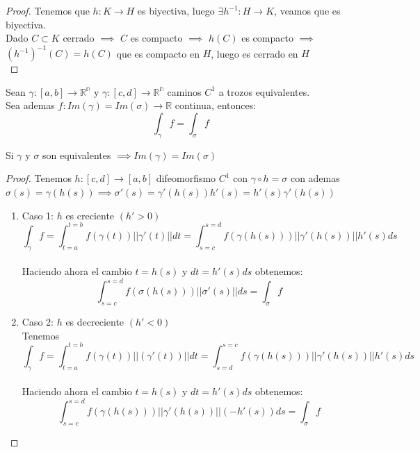 \begin{proof}
    Tenemos que $h:K \to H$ es biyectiva, luego $\exists h^{-1}:H \to K$, veamos que es biyectiva. \\
    Dado $C \subset K$ cerrado $\implies$ $C$ es compacto $\implies$ $h(C)$ es compacto $\implies$ $(h^{-1})^{-1}(C)=h(C)$ que es compacto en $H$, luego es cerrado en $H$ \\
\end{proof}

\begin{teorema}
    Sean $\gamma: [a,b] \to \mathbb{R^n}$ y $\gamma:[c,d] \to \mathbb{R^n}$ caminos $C^1$ a trozos equivalentes. \\
    Sea ademas $f:Im(\gamma)=Im(\sigma) \to \mathbb{R}$ continua, entonces: \\
    $$\int_{\gamma}f=\int_{\sigma}f$$
\end{teorema}

\begin{observación}
    Si $\gamma$ y $\sigma$ son equivalentes $\implies Im(\gamma)=Im(\sigma)$
\end{observación}

\begin{proof}
    Tenemos $h:[c,d] \to [a,b]$ difeomorfismo $C^1$ con $\gamma \circ h = \sigma$ con ademas $\sigma(s) = \gamma(h(s)) \implies \sigma'(s) = \gamma'(h(s))h'(s)=h'(s)\gamma'(h(s))$ \\
    \begin{enumerate}
        \item Caso 1: $h$ es creciente $(h'>0)$ \\
        $$\int_{\gamma} f = \int_{t=a}^{t=b} f(\gamma(t))||\gamma'(t)||dt = \int_{s=c}^{s=d} f(\gamma(h(s))) ||\gamma'(h(s))||h'(s)ds$$ \\
        Haciendo ahora el cambio $t=h(s)$ y $dt=h'(s)ds$ obtenemos:
        $$\int_{s=c}^{s=d} f(\sigma(h(s)))||\sigma'(s)||ds=\int_{\sigma}f$$
        \item Caso 2: $h$ es decreciente $(h'<0)$\\
        Tenemos $$ \int_{\gamma} f= \int_{t=a}^{t=b} f(\gamma(t)) ||(\gamma'(t))||dt=\int_{s=d}^{s=c}f(\gamma(h(s)))||\gamma'(h(s))||h'(s)ds$$ \\
        Haciendo ahora el cambio $t=h(s)$ y $dt=h'(s)ds$ obtenemos:
        $$\int_{s=c}^{s=d} f(\gamma(h(s)))||\gamma'(h(s))||(-h'(s))ds = \int_{\sigma}f$$ 
    \end{enumerate}
\end{proof}

